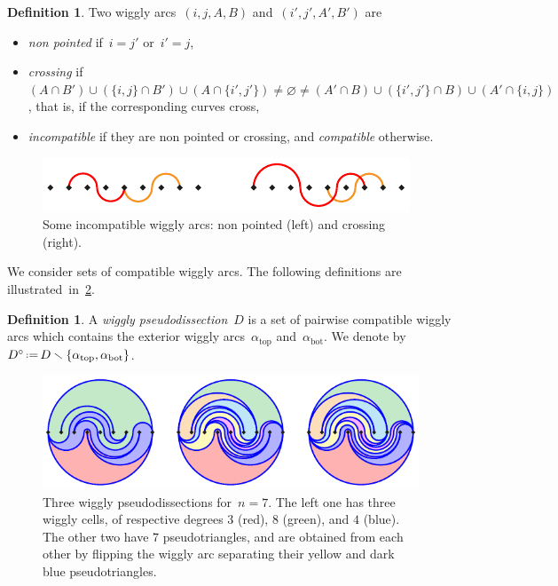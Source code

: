 \documentclass{amsart}
\theoremstyle{definition}
\newtheorem{definition}[theorem]{Definition}
\newcommand{\ssm}{\smallsetminus} %
\newcommand{\eqdef}{\mbox{\,\raisebox{0.2ex}{\scriptsize\ensuremath{\mathrm:}}\ensuremath{=}\,}} %
\newcommand{\darkblue}{\color{darkblue}} %
\newcommand{\defn}[1]{\textsl{\darkblue #1}} %
\begin{document}
\begin{definition}
\label{def:compatible}
Two wiggly arcs~$(i,j,A,B)$ and~$(i',j',A',B')$ are 
\begin{itemize}
\item \defn{non pointed} if~$i = j'$ or~$i' = j$,
\item \defn{crossing} if~$(A \cap B') \cup (\{i,j\} \cap B') \cup (A \cap \{i',j'\}) \ne \varnothing \ne (A' \cap B) \cup (\{i',j'\} \cap B) \cup (A' \cap \{i,j\})$, that is, if the corresponding curves cross,
\item \defn{incompatible} if they are non pointed or crossing, and \defn{compatible} otherwise.
\end{itemize}
%
\begin{figure}[h]
\centerline{\includegraphics[scale=1.3]{incompatible}}
\caption{Some incompatible wiggly arcs: non pointed (left) and crossing (right).}
\label{fig:incompatible}
\end{figure}
\end{definition}

We consider sets of compatible wiggly arcs.
The following definitions are illustrated~in~\cref{fig:pseudodissections}.

\begin{definition}
A \defn{wiggly pseudodissection}~$D$ is a set of pairwise compatible wiggly arcs which contains the exterior wiggly arcs~$\alpha_\mathrm{top}$ and~$\alpha_\mathrm{bot}$. We denote by~$D^\circ \eqdef D \ssm \{\alpha_\mathrm{top}, \alpha_\mathrm{bot}\}$.
%
\begin{figure}[b]
\centerline{\includegraphics[scale=1.5]{wigglyPseudodissections}}
\caption{Three wiggly pseudodissections for~$n = 7$. The left one has three wiggly cells, of respective degrees $3$ (red), $8$ (green), and $4$ (blue). The other two have $7$ pseudotriangles, and are obtained from each other by flipping the wiggly arc separating their yellow and dark blue pseudotriangles.}
\label{fig:pseudodissections}
\end{figure}
\end{definition}
\end{document}
